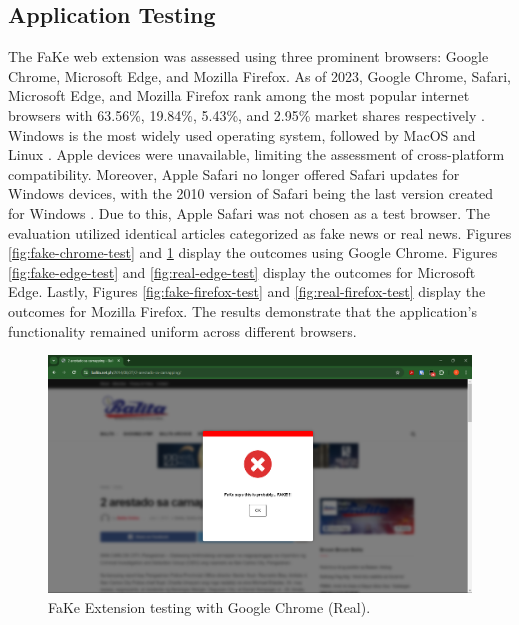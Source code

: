 \subsection{Application Testing}
\label{subsec::app-testing}
The FaKe web extension was assessed using three prominent browsers: Google Chrome, Microsoft Edge, and Mozilla Firefox. As of 2023,
Google Chrome, Safari, Microsoft Edge, and Mozilla Firefox rank among the most popular internet browsers with 63.56\%, 19.84\%,
5.43\%, and 2.95\%  market shares respectively \cite{statista2024}. Windows is the most widely used operating system, followed by
MacOS and Linux \cite{idris2021}. Apple devices were unavailable, limiting the assessment of cross-platform compatibility.
Moreover, Apple Safari no longer offered Safari updates for Windows devices, with the 2010 version of Safari being the last
version created for Windows \cite{apple2024}. Due to this, Apple Safari was not chosen as a test browser. The evaluation utilized identical articles categorized as fake news or real news. Figures \ref{fig:fake-chrome-test} and \ref{fig:real-chrome-test} display the outcomes using Google Chrome. Figures \ref{fig:fake-edge-test} and \ref{fig:real-edge-test} display the outcomes for Microsoft Edge. Lastly, Figures \ref{fig:fake-firefox-test} and \ref{fig:real-firefox-test} display the outcomes for Mozilla Firefox. The results demonstrate that the application's functionality remained uniform across different browsers.

        \begin{figure}[h!]
            \centering
            \includegraphics[width=1\textwidth,height=1\textheight, keepaspectratio]{figures/Screenshots/chrome-true-positive.png}
            \caption{FaKe Extension testing with Google Chrome (Real).}
            \label{fig:real-chrome-test}
        \end{figure}

